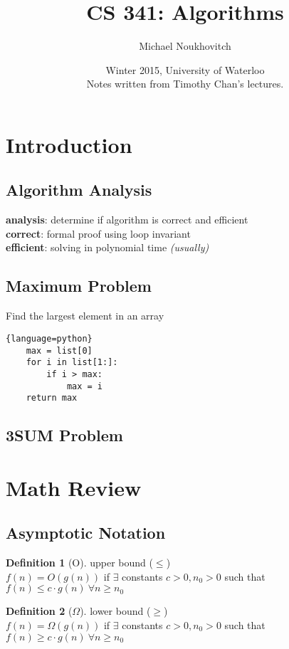 \documentclass[]{article}
\theoremstyle{definition}
\newtheorem*{defn}{Definition}
\begin{document}
	\let\ref\Cref

	\title{\bf{CS 341: Algorithms}}
	\date{Winter 2015, University of Waterloo \\ \center Notes written from Timothy Chan's lectures.}
	\author{Michael Noukhovitch}

	\maketitle
	\newpage
	\tableofcontents
	\newpage

	\section{Introduction}
		\subsection{Algorithm Analysis}
			\textbf{analysis}: determine if algorithm is correct and efficient \\
			\textbf{correct}: formal proof using loop invariant \\
			\textbf{efficient}: solving in polynomial time \textit{(usually)}
		\subsection{Maximum Problem}
			Find the largest element in an array
			\begin{lstlisting}{language=python}
	max = list[0]
	for i in list[1:]:
		if i > max:
			max = i
	return max
			\end{lstlisting}		
		\subsection{3SUM Problem}
	\section{Math Review}
		\subsection{Asymptotic Notation}
			\begin{defn}[O]
				upper bound ($\le$) \\
				$f(n) = O(g(n))$ if $\exists$ constants $c > 0, n_0 > 0$ such that $f(n) \le c \cdot g(n) \ \forall n \ge n_0$
			\end{defn}

			\begin{defn}[$\Omega$]
				lower bound ($\ge$) \\
				$f(n) = \Omega(g(n))$ if $\exists$ constants $c > 0, n_0 > 0$ such that $f(n) \ge c \cdot g(n) \ \forall n \ge n_0$
			\end{defn}
\end{document}
